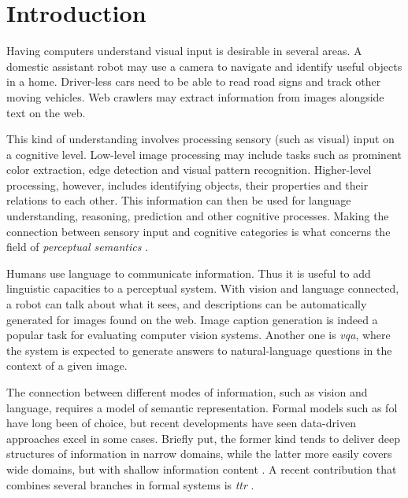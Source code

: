 \glsresetall
\section{Introduction}
\label{sec:intro}

Having computers understand visual input is desirable in several areas.
A domestic assistant robot may use a camera to navigate and identify useful objects in a home.
Driver-less cars need to be able to read road signs and track other moving vehicles.
Web crawlers may extract information from images alongside text on the web.

This kind of understanding involves processing sensory (such as visual) input on a cognitive level.
Low-level image processing may include tasks such as prominent color extraction, edge detection and visual pattern recognition.
Higher-level processing, however, includes identifying objects, their properties and their relations to each other.
This information can then be used for language understanding, reasoning, prediction and other cognitive processes.
Making the connection between sensory input and cognitive categories is what concerns the field of \textit{perceptual semantics} \citep{PustejovskyPerceptualsemanticsconstruction1990}.

Humans use language to communicate information.
Thus it is useful to add linguistic capacities to a perceptual system.
With vision and language connected, a robot can talk about what it sees, and descriptions can be automatically generated for images found on the web.
Image caption generation is indeed a popular task for evaluating computer vision systems.
Another one is \textit{\gls{vqa}}, where the system is expected to generate answers to natural-language questions in the context of a given image.

The connection between different modes of information, such as vision and language, requires a model of semantic representation.
Formal models such as \gls{fol} have long been of choice, but recent developments have seen data-driven approaches excel in some cases.
Briefly put, the former kind tends to deliver deep structures of information in narrow domains, while the latter more easily covers wide domains, but with shallow information content \citep{SimonDobnikModularmechanisticnetworks2017}.
A recent contribution that combines several branches in formal systems is \textit{\gls{ttr}} \citep{CooperAustiniantruthattitudes2005,CooperTypetheorylanguage2016}.

